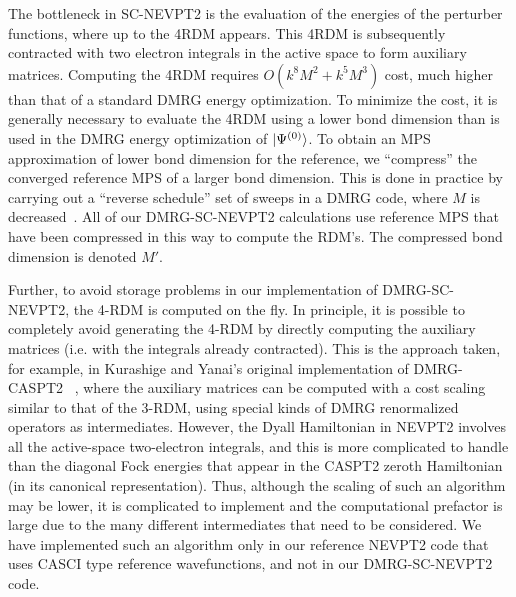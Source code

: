 The bottleneck in SC-NEVPT2 is the evaluation of the energies of the perturber functions, 
where up to the 4RDM appears. This 4RDM is subsequently contracted with 
two electron integrals in the active space to form auxiliary matrices.\cite{ angeli_n-electron_2002} 
Computing the 4RDM requires $O(k^8M^2+k^5M^3)$ cost, much higher than that of a standard DMRG energy optimization.
To minimize the cost, it is generally necessary to evaluate the 4RDM using a lower bond dimension than is used in the DMRG energy optimization of $\ket{\Psi^{(0)}}$.
To obtain an MPS approximation of lower bond dimension for the reference, 
we  ``compress'' the converged reference MPS of a larger bond dimension.
 This is done in practice by carrying out a ``reverse schedule'' set of sweeps
in a DMRG code, where $M$ is decreased~\cite{olivares-amaya_ab-initio_2015}. All of our DMRG-SC-NEVPT2 calculations use reference MPS that have been 
compressed in this way to compute the RDM's. The compressed bond dimension is
denoted $M'$.

Further, to avoid storage problems in our implementation of DMRG-SC-NEVPT2, 
the 4-RDM is computed on the fly. In principle, it is possible to 
completely avoid generating the 4-RDM by directly computing the auxiliary matrices (i.e. with the integrals already contracted). 
This is the approach taken, for example, in Kurashige and Yanai's original implementation of DMRG-CASPT2
~\cite{kurashige_second-order_2011}, where the auxiliary matrices can be computed with a cost scaling similar to that of the 3-RDM,
using special kinds of DMRG renormalized operators as intermediates. However, the Dyall Hamiltonian in NEVPT2 
involves all the active-space two-electron integrals, and this is more complicated to handle than the diagonal Fock energies that appear in the CASPT2 zeroth 
Hamiltonian (in its canonical representation). Thus, although the scaling of such an algorithm may be lower, it is complicated to implement
and the computational prefactor is large due to the many different intermediates that need to be considered. We have implemented
such an algorithm only in our reference NEVPT2 code that uses CASCI type reference wavefunctions, and not in our DMRG-SC-NEVPT2 code.





